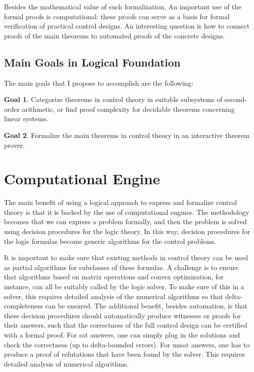 \documentclass[10pt]{article}
\theoremstyle{definition}
\newtheorem{goal}{Goal}
\begin{document}
Besides the mathematical value of such formalization, An important use of the formal proofs is computational: these proofs can serve as a basis for formal verification of practical control designs. An interesting question is how to connect proofs of the main theorems to automated proofs of the concrete designs. 

\subsection{Main Goals in Logical Foundation}

The main goals that I propose to accomplish are the following:
\begin{goal}
Categorize theorems in control theory in suitable subsystems of second-order arithmetic, or find proof complexity for decidable theorems concerning linear systems. 
\end{goal}
\begin{goal}
Formalize the main theorems in control theory in an interactive theorem prover.  
\end{goal}

\section{Computational Engine}\label{ce}

The main benefit of using a logical approach to express and formalize control theory is that it is backed by the use of computational engines. The methodology becomes that we can express a problem formally, and then the problem is solved using decision procedures for the logic theory. In this way, decision procedures for the logic formulas become generic algorithms for the control problems. 

It is important to make sure that existing methods in control theory can be used as partial algorithms for subclasses of these formulas. A challenge is to ensure that algorithms based on matrix operations and convex optimization, for instance, can all be suitably called by the logic solver. To make sure of this in a solver, this requires detailed analysis of the numerical algorithms so that delta-completeness can be ensured. The additional benefit, besides automation, is that these decision procedures should automatically produce witnesses or proofs for their answers, such that the correctness of the full control design can be certified with a formal proof. For sat answers, one can simply plug in the solutions and check the correctness (up to delta-bounded errors). For unsat answers, one has to produce a proof of refutations that have been found by the solver. This requires detailed analysis of numerical algorithms.
\end{document}
